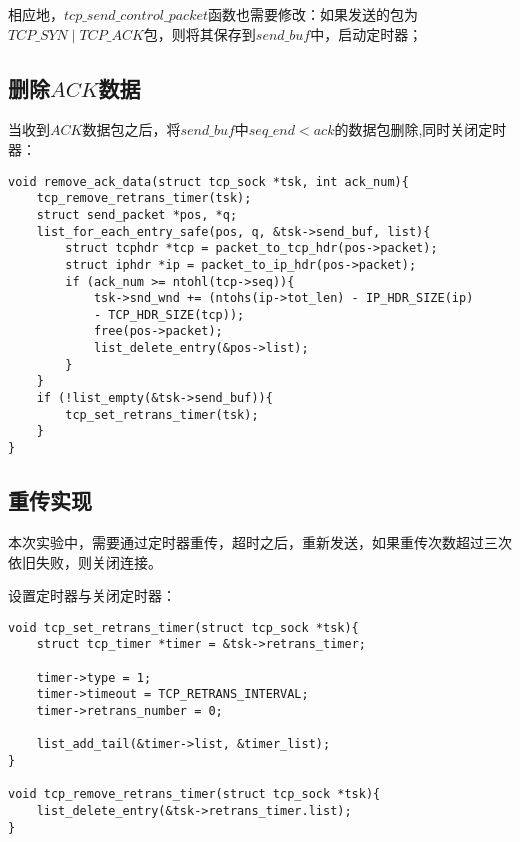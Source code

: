 \documentclass[UTF8,noindent]{ctexart}
\begin{document}
相应地，$tcp\_send\_control\_packet$函数也需要修改：如果发送的包为$TCP\_SYN\mid TCP\_ACK$包，则将其保存到$send\_buf$中，启动定时器；

\subsection{删除$ACK$数据}
当收到$ACK$数据包之后，将$send\_buf$中$seq\_end <ack$的数据包删除,同时关闭定时器：
\begin{lstlisting}
void remove_ack_data(struct tcp_sock *tsk, int ack_num){
	tcp_remove_retrans_timer(tsk);
	struct send_packet *pos, *q;
	list_for_each_entry_safe(pos, q, &tsk->send_buf, list){
		struct tcphdr *tcp = packet_to_tcp_hdr(pos->packet);
		struct iphdr *ip = packet_to_ip_hdr(pos->packet);
		if (ack_num >= ntohl(tcp->seq)){
			tsk->snd_wnd += (ntohs(ip->tot_len) - IP_HDR_SIZE(ip) 
			- TCP_HDR_SIZE(tcp));
			free(pos->packet);
			list_delete_entry(&pos->list);
		}
	}
	if (!list_empty(&tsk->send_buf)){
		tcp_set_retrans_timer(tsk);
	}
}
\end{lstlisting}

\subsection{重传实现}
本次实验中，需要通过定时器重传，超时之后，重新发送，如果重传次数超过三次依旧失败，则关闭连接。

设置定时器与关闭定时器：
\begin{lstlisting}
void tcp_set_retrans_timer(struct tcp_sock *tsk){
	struct tcp_timer *timer = &tsk->retrans_timer;

	timer->type = 1;
	timer->timeout = TCP_RETRANS_INTERVAL;
	timer->retrans_number = 0;

	list_add_tail(&timer->list, &timer_list);
}

void tcp_remove_retrans_timer(struct tcp_sock *tsk){
	list_delete_entry(&tsk->retrans_timer.list);
}
\end{lstlisting}
\end{document}
